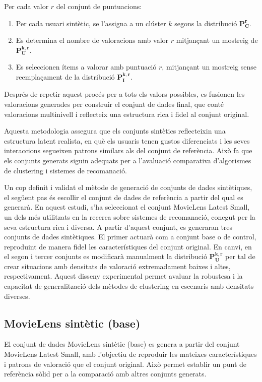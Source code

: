 \documentclass[a4paper,12pt]{report}
\begin{document}
Per cada valor $r$ del conjunt de puntuacions:
\begin{enumerate}
    \item Per cada usuari sintètic, se l’assigna a un clúster $k$ segons la distribució $\mathbf{P_C^r}$.
    \item Es determina el nombre de valoracions amb valor $r$ mitjançant un mostreig de $\mathbf{P_U^{k,r}}$.
    \item Es seleccionen ítems a valorar amb puntuació $r$, mitjançant un mostreig sense reemplaçament de la distribució $\mathbf{P_I^{k,r}}$.
\end{enumerate}

Després de repetir aquest procés per a tots els valors possibles, es fusionen les valoracions generades per construir el conjunt de dades final, que conté valoracions multinivell i reflecteix una estructura rica i fidel al conjunt original.

Aquesta metodologia assegura que els conjunts sintètics reflecteixin una estructura latent realista, en què els usuaris tenen gustos diferenciats i les seves interaccions segueixen patrons similars als del conjunt de referència. Això fa que els conjunts generats siguin adequats per a l’avaluació comparativa d’algorismes de clustering i sistemes de recomanació.

Un cop definit i validat el mètode de generació de conjunts de dades sintètiques, el següent pas és escollir el conjunt de dades de referència a partir del qual es generarà. En aquest estudi, s’ha seleccionat el conjunt MovieLens Latest Small, un dels més utilitzats en la recerca sobre sistemes de recomanació, conegut per la seva estructura rica i diversa. A partir d’aquest conjunt, es generaran tres conjunts de dades sintètiques. El primer actuarà com a conjunt base o de control, reproduint de manera fidel les característiques del conjunt original. En canvi, en el segon i tercer conjunts es modificarà manualment la distribució $\mathbf{P_U^{k,r}}$ per tal de crear situacions amb densitats de valoració extremadament baixes i altes, respectivament. Aquest disseny experimental permet avaluar la robustesa i la capacitat de generalització dels mètodes de clustering en escenaris amb densitats diverses.

\subsection{MovieLens sintètic (base)}

El conjunt de dades MovieLens sintètic (base) es genera a partir del conjunt MovieLens Latest Small, amb l’objectiu de reproduir les mateixes característiques i patrons de valoració que el conjunt original. Això permet establir un punt de referència sòlid per a la comparació amb altres conjunts generats.
\end{document}
